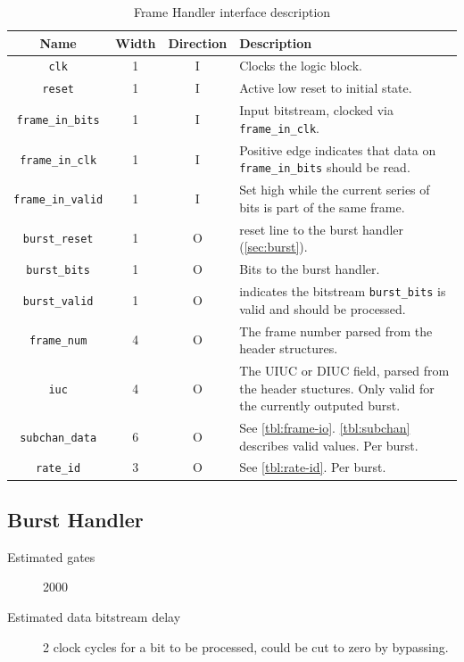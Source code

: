 \documentclass[dvips,10pt,twocolumn]{article}
\newcommand{\wire}{\texttt}
\begin{document}
\begin{table} \begin{tabularx}{\linewidth}{c|c|c|X} \label{tbl:frame-io}
	Name & Width & Direction & Description \\ \hline

	\wire{clk} & 1 & I & Clocks the logic block.\\

	\wire{reset} & 1 & I & Active low reset to initial state. \\


	\wire{frame\_in\_bits} & 1 & I & Input bitstream, clocked via
	\wire{frame\_in\_clk}. \\

	\wire{frame\_in\_clk} & 1 & I & Positive edge indicates that data on
	\wire{frame\_in\_bits} should be read. \\
	
	\wire{frame\_in\_valid} & 1 & I & Set high while the current series
	of bits is part of the same frame. \\

	\wire{burst\_reset} & 1 & O & reset line to the burst handler
	(\autoref{sec:burst}). \\

	\wire{burst\_bits} & 1 & O & Bits to the burst handler. \\

	\wire{burst\_valid} & 1 & O & indicates the bitstream
	\wire{burst\_bits} is valid and should be processed. \\


	\wire{frame\_num} & 4 & O & The frame number parsed from the header
	structures. \\

	\wire{iuc} & 4 & O & The UIUC or DIUC field, parsed from the header
	stuctures. Only valid for the currently outputed burst. \\

	\wire{subchan\_data} & 6 & O & See \autoref{tbl:frame-io}.
	\autoref{tbl:subchan} describes valid values. Per burst. \\

	\wire{rate\_id} & 3 & O & See \autoref{tbl:rate-id}. Per burst. \\

\end{tabularx} \caption{Frame Handler interface description} \end{table}


\subsection{Burst Handler} \label{sec:burst}
\begin{description}
	\item[Estimated gates] 2000 
	\item[Estimated data bitstream delay] 2 clock cycles for a bit to be
		processed, could be cut to zero by bypassing.
\end{description}
\end{document}
